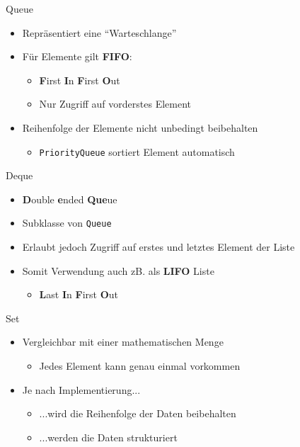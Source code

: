 \begin{frame}{Queue}
    \begin{itemize}[<+->]
        \item Repräsentiert eine "`Warteschlange"'
        \item Für Elemente gilt \textbf{FIFO}:
        \begin{itemize}
            \item \textbf{F}irst \textbf{I}n \textbf{F}irst \textbf{O}ut
            \item Nur Zugriff auf vorderstes Element
        \end{itemize}
        \item Reihenfolge der Elemente nicht unbedingt beibehalten
        \begin{itemize}
            \item \texttt{PriorityQueue} sortiert Element automatisch
        \end{itemize}
    \end{itemize}
\end{frame}

\begin{frame}{Deque}
    \begin{itemize}[<+->]
        \item \textbf{D}ouble \textbf{e}nded \textbf{Que}ue
        \item Subklasse von \texttt{Queue}
        \item Erlaubt jedoch Zugriff auf erstes und letztes Element der Liste
        \item Somit Verwendung auch zB. als \textbf{LIFO} Liste
        \begin{itemize}
            \item \textbf{L}ast \textbf{I}n \textbf{F}irst \textbf{O}ut
        \end{itemize}
    \end{itemize}
\end{frame}

\begin{frame}{Set}
    \begin{itemize}
        \item Vergleichbar mit einer mathematischen Menge
        \begin{itemize}
            \item Jedes Element kann genau einmal vorkommen
        \end{itemize}
        \item Je nach Implementierung...
        \begin{itemize}
            \item ...wird die Reihenfolge der Daten beibehalten
            \item ...werden die Daten strukturiert
        \end{itemize}
    \end{itemize}
\end{frame}

